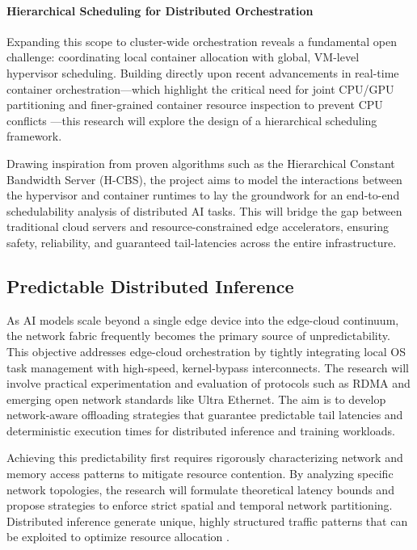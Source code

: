 \documentclass[11pt,a4paper]{article}
\begin{document}
\paragraph{Hierarchical Scheduling for Distributed Orchestration}
Expanding this scope to cluster-wide orchestration reveals a fundamental open challenge: coordinating local container allocation with global, VM-level hypervisor scheduling. Building directly upon recent advancements in real-time container orchestration---which highlight the critical need for joint CPU/GPU partitioning and finer-grained container resource inspection to prevent CPU conflicts \cite{samimi2025enabling}---this research will explore the design of a hierarchical scheduling framework.

Drawing inspiration from proven algorithms such as the Hierarchical Constant Bandwidth Server (H-CBS)\cite{lipari2001hierarchical}, the project aims to model the interactions between the hypervisor and container runtimes to lay the groundwork for an end-to-end schedulability analysis of distributed AI tasks.  This will bridge the gap between traditional cloud servers and resource-constrained edge accelerators, ensuring safety, reliability, and guaranteed tail-latencies across the entire infrastructure.

\subsection{Predictable Distributed Inference}
\label{sec:distributed}
As AI models scale beyond a single edge device into the edge-cloud continuum\cite{moreschini2022cloud}, the network fabric frequently becomes the primary source of unpredictability\cite{metz2024empowering}. This objective addresses edge-cloud orchestration by tightly integrating local OS task management with high-speed, kernel-bypass interconnects. The research will involve practical experimentation and evaluation of protocols such as RDMA\cite{guo2016rdma} and emerging open network standards like Ultra Ethernet\cite{hoefler2025ultra}. The aim is to develop network-aware offloading strategies that guarantee predictable tail latencies and deterministic execution times for distributed inference and training workloads.

Achieving this predictability first requires rigorously characterizing network and memory access patterns to mitigate resource contention. By analyzing specific network topologies, the research will formulate theoretical latency bounds and propose strategies to enforce strict spatial and temporal network partitioning. Distributed inference generate unique, highly structured traffic patterns that can be exploited to optimize resource allocation \cite{buschmann2025llms}.
\end{document}
